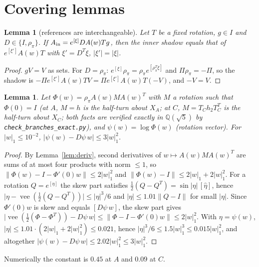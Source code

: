 \documentclass[11pt]{amsart}
\newtheorem{lemma}[theorem]{Lemma}
\theoremstyle{definition}
\newcommand{\Q}{\mathbb{Q}}
\newcommand{\sq}{\sqrt5}
\newcommand{\Prj}{\Pi}
\newcommand{\abs}[1]{\lvert #1\rvert}
\newcommand{\norm}[1]{\lVert #1\rVert}
\begin{document}
\appendix
\section{Covering lemmas}\label{app:cover}

\begin{lemma}[references are interchangeable]\label{lem:refs}
Let $T$ be a fixed rotation, $g\in I$ and $D\in\{I,\rho_\pi\}$. If
$A_{\rm in}=e^{[\xi]}DA(w)Tg$, then the inner shadow equals that of $e^{[\xi']}A(w)T$ with $\xi'=D^{T}\xi$, $\abs{\xi'}=\abs\xi$.
\end{lemma}
\begin{proof}
$gV=V$ as sets. For $D=\rho_\pi$: $e^{[\xi]}\rho_\pi=\rho_\pi e^{[\rho_\pi^T\xi]}$ and $\Prj\rho_\pi=-\Prj$, so the shadow is
$-\Prj e^{[\xi']}A(w)TV=\Prj e^{[\xi']}A(w)T(-V)$, and $-V=V$.
\end{proof}

\begin{lemma}\label{lem:psi}
Let $\Phi(w)=\rho_\pi A(w)MA(w)^{T}$ with $M$ a rotation such that $\Phi(0)=I$ (at $A$, $M=h$ is the half-turn about
$X_A$; at $C$, $M=T_Ch_2T_C^T$ is the half-turn about $X_C$; both facts are verified exactly in $\Q(\sq)$ by
\texttt{check\_branches\_exact.py}), and $\psi(w)=\log\Phi(w)$ (rotation
vector). For $\abs w_1\le 10^{-2}$, $\abs{\psi(w)-D\psi\,w}\le 3\abs w_1^2$.
\end{lemma}
\begin{proof}
By Lemma~\ref{lem:deriv}, second derivatives of $w\mapsto A(w)MA(w)^T$ are sums of at most four products with norm
$\le1$, so $\norm{\Phi(w)-I-\Phi'(0)w}\le2\abs w_1^2$ and $\norm{\Phi(w)-I}\le2\abs w_1+2\abs w_1^2$. For a rotation
$Q=e^{[\eta]}$ the skew part satisfies $\tfrac12(Q-Q^T)=\sin\abs\eta\,[\hat\eta]$, hence
$\abs{\eta-\operatorname{vee}(\tfrac12(Q-Q^{T}))}\le\abs\eta^3/6$ and $\abs\eta\le 1.01\norm{Q-I}$ for small $\abs\eta$.
Since $\Phi'(0)w$ is skew and equals $[D\psi\,w]$, the skew part gives
$\abs{\operatorname{vee}(\tfrac12(\Phi-\Phi^T))-D\psi\,w}\le\norm{\Phi-I-\Phi'(0)w}\le2\abs w_1^2$. With $\eta=\psi(w)$,
$\abs\eta\le1.01\cdot(2\abs w_1+2\abs w_1^2)\le0.021$, hence $\abs\eta^3/6\le1.5\abs w_1^3\le0.015\abs w_1^2$, and altogether
$\abs{\psi(w)-D\psi\,w}\le2.02\abs w_1^2\le3\abs w_1^2$.
\end{proof}
Numerically the constant is $0.45$ at $A$ and $0.09$ at $C$.
\end{document}
